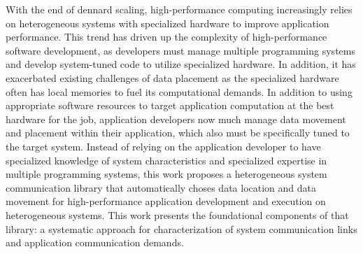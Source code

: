 With the end of dennard scaling, high-performance computing increasingly relies on heterogeneous systems with specialized hardware to improve application performance.
This trend has driven up the complexity of high-performance software development, as developers must manage multiple programming systems and develop system-tuned code to utilize specialized hardware.
In addition, it has exacerbated existing challenges of data placement as the specialized hardware often has local memories to fuel its computational demands.
In addition to using appropriate software resources to target application computation at the best hardware for the job, application developers now much manage data movement and placement within their application, which also must be specifically tuned to the target system.
Instead of relying on the application developer to have specialized knowledge of system characteristics and specialized expertise in multiple programming systems, this work proposes a heterogeneous system communication library that automatically choses data location and data movement for high-performance application development and execution on heterogeneous systems.
This work presents the foundational components of that library: a systematic approach for characterization of system communication links and application communication demands.